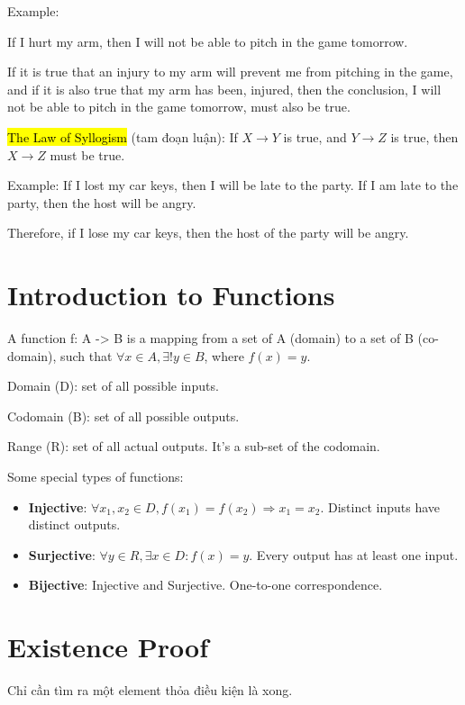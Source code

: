 Example:

If I hurt my arm, then I will not be able to pitch in the game tomorrow.

If it is true that an injury to my arm will prevent me from pitching in the game, and if it is also true that my arm has been, injured, then the conclusion, I will not be able to pitch in the game tomorrow, must also be true.

\vspace{.5cm}

\hl{The Law of Syllogism} (tam đoạn luận): If $X \rightarrow Y$ is true, and $Y \rightarrow Z$ is true, then $X \rightarrow Z$ must be true.

Example: If I lost my car keys, then I will be late to the party. If I am late to the party, then the host will be angry.

Therefore, if I lose my car keys, then the host of the party will be angry.

\section{Introduction to Functions}

A function f: A -> B is a mapping from a set of A (domain) to a set of B (co-domain), such that $\forall x\in A, \exists !y \in B$, where $f(x)=y$.

Domain (D): set of all possible inputs.

Codomain (B): set of all possible outputs.

Range (R): set of all actual outputs. It's a sub-set of the codomain.

Some special types of functions:

\begin{itemize}
  \item \textbf{Injective}: $\forall x_{1}, x_{2}\in D, f(x_{1})=f(x_{2}) \Rightarrow x_{1}=x_{2}$. Distinct inputs have distinct outputs.
  \item \textbf{Surjective}: $\forall y \in R, \exists x \in D : f(x)=y$. Every output has at least one input.
  \item \textbf{Bijective}: Injective and Surjective. One-to-one correspondence.
\end{itemize}

\section{Existence Proof}

Chỉ cần tìm ra một element thỏa điều kiện là xong.

